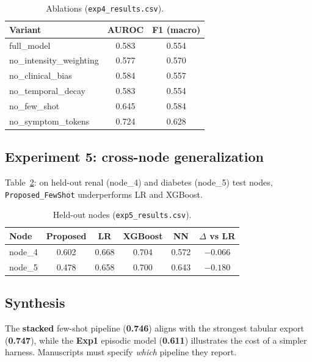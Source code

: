 \begin{table}[htbp]
  \centering
  \caption{Ablations (\texttt{exp4\_results.csv}).}
  \label{tab:exp4}
  \begin{tabular}{lcc}
    \toprule
    Variant & AUROC & F1 (macro) \\
    \midrule
    full\_model & 0.583 & 0.554 \\
    no\_intensity\_weighting & 0.577 & 0.570 \\
    no\_clinical\_bias & 0.584 & 0.557 \\
    no\_temporal\_decay & 0.583 & 0.554 \\
    no\_few\_shot & 0.645 & 0.584 \\
    no\_symptom\_tokens & 0.724 & 0.628 \\
    \bottomrule
  \end{tabular}
\end{table}

\subsection{Experiment 5: cross-node generalization}
Table~\ref{tab:exp5}: on held-out renal (node\_4) and diabetes (node\_5) test nodes, \texttt{Proposed\_FewShot} underperforms LR and XGBoost.

\begin{table}[htbp]
  \centering
  \caption{Held-out nodes (\texttt{exp5\_results.csv}).}
  \label{tab:exp5}
  \begin{tabular}{lccccc}
    \toprule
    Node & Proposed & LR & XGBoost & NN & $\Delta$ vs LR \\
    \midrule
    node\_4 & 0.602 & 0.668 & 0.704 & 0.572 & $-0.066$ \\
    node\_5 & 0.478 & 0.658 & 0.700 & 0.643 & $-0.180$ \\
    \bottomrule
  \end{tabular}
\end{table}

\subsection{Synthesis}
The \textbf{stacked} few-shot pipeline (\textbf{0.746}) aligns with the strongest tabular export (\textbf{0.747}), while the \textbf{Exp1} episodic model (\textbf{0.611}) illustrates the cost of a simpler harness. Manuscripts must specify \emph{which} pipeline they report.
